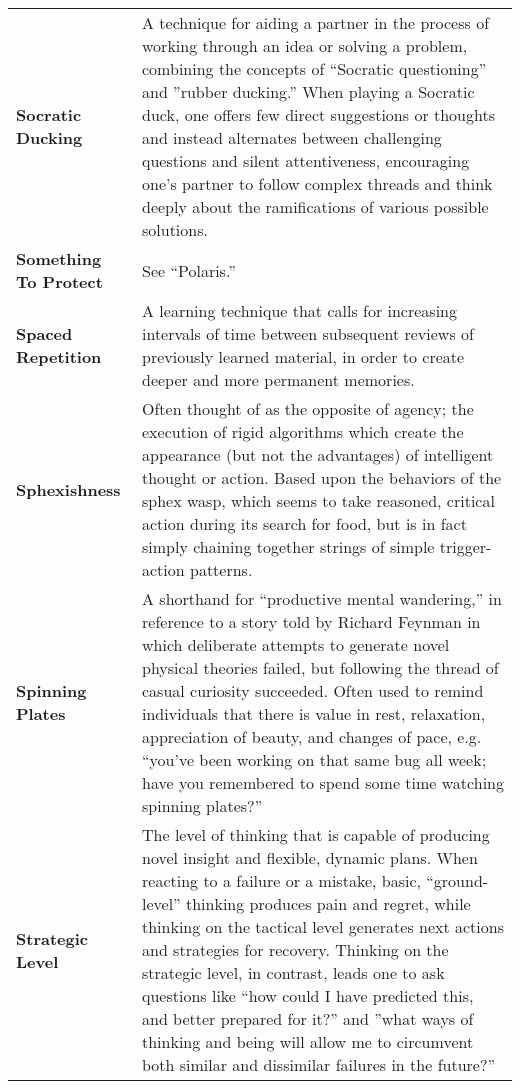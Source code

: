 \begin{longtable} { p{} p{} }
\textbf{Socratic Ducking} & A technique for aiding a partner in the process of working through an idea or solving a problem, combining the concepts of ``Socratic questioning'' and ''rubber ducking.''  When playing a Socratic duck, one offers few direct suggestions or thoughts and instead alternates between challenging questions and silent attentiveness, encouraging one's partner to follow complex threads and think deeply about the ramifications of various possible solutions.\\

\textbf{Something To Protect} & See ``Polaris.''\\

\textbf{Spaced Repetition} & A learning technique that calls for increasing intervals of time between subsequent reviews of previously learned material, in order to create deeper and more permanent memories.\\

\textbf{Sphexishness} & Often thought of as the opposite of agency; the execution of rigid algorithms which create the appearance (but not the advantages) of intelligent thought or action.  Based upon the behaviors of the sphex wasp, which seems to take reasoned, critical action during its search for food, but is in fact simply chaining together strings of simple trigger-action patterns.\\

\textbf{Spinning Plates} & A shorthand for ``productive mental wandering,'' in reference to a story told by Richard Feynman in which deliberate attempts to generate novel physical theories failed, but following the thread of casual curiosity succeeded.  Often used to remind individuals that there is value in rest, relaxation, appreciation of beauty, and changes of pace, e.g. ``you've been working on that same bug all week; have you remembered to spend some time watching spinning plates?''\\

\textbf{Strategic Level} & The level of thinking that is capable of producing novel insight and flexible, dynamic plans.  When reacting to a failure or a mistake, basic, ``ground-level'' thinking produces pain and regret, while thinking on the tactical level generates next actions and strategies for recovery.  Thinking on the strategic level, in contrast, leads one to ask questions like ``how could I have predicted this, and better prepared for it?'' and ''what ways of thinking and being will allow me to circumvent both similar and dissimilar failures in the future?''\\


\end{longtable}
